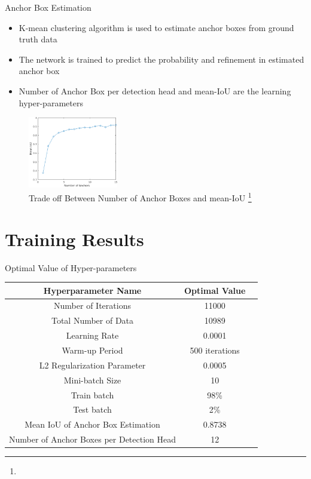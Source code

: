\documentclass[10pt]{beamer}
\begin{document}
\begin{frame}{Anchor Box Estimation}
\begin{itemize}
    \item K-mean clustering algorithm is used to estimate anchor boxes from ground truth data
    \item The network is trained to predict the probability and refinement in estimated anchor box
    \item Number of Anchor Box per detection head and mean-IoU are the learning hyper-parameters
\end{itemize}

\begin{figure}
    \centering
    \includegraphics[width=0.35\textwidth]{Images/imperical.png}
     \caption{Trade off Between Number of Anchor Boxes and mean-IoU \footnote{}}
\end{figure}
\end{frame}



\section{Training Results}

\begin{frame}{Optimal Value of Hyper-parameters}
\begin{table}
    \centering
    \begin{tabular}{|c|c|c|}
        \hline
        \textbf{Hyperparameter Name} & \textbf{Optimal Value} \\
        \hline
        Number of Iterations & 11000 \\
        \hline
        Total Number of Data & 10989\\ 
        \hline
        Learning Rate & 0.0001 \\
        \hline
        Warm-up Period & 500 iterations \\
        \hline
        L2 Regularization Parameter & 0.0005 \\
        \hline  
        Mini-batch Size & 10 \\
        \hline
        Train batch & 98\% \\
        \hline
        Test batch & 2\% \\
        \hline 
        Mean IoU of Anchor Box Estimation & 0.8738 \\
        \hline
        Number of Anchor Boxes per Detection Head & 12 \\
        \hline
    \end{tabular}
\end{table}
\end{frame}
\end{document}

